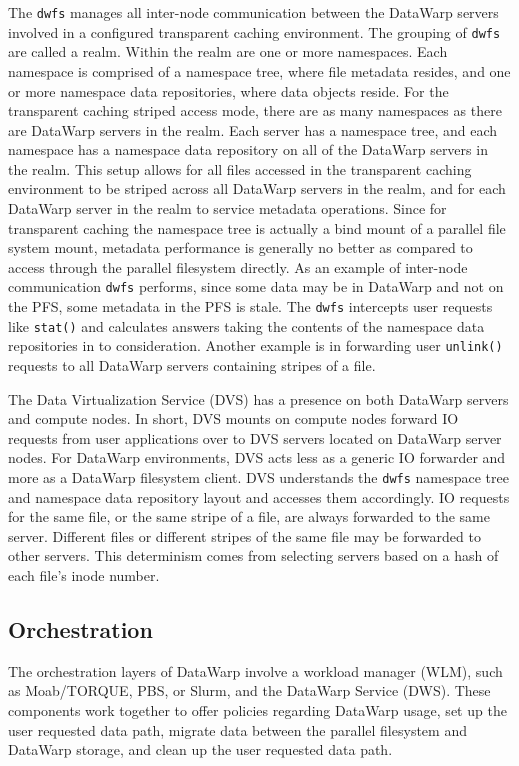 \documentclass[10pt, conference, compsocconf]{IEEEtran}
\begin{document}
The \texttt{dwfs} manages all inter-node communication between the DataWarp servers involved in a configured transparent caching environment.  The grouping of \texttt{dwfs} are called a realm.  Within the realm are one or more namespaces.  Each namespace is comprised of a namespace tree, where file metadata resides, and one or more namespace data repositories, where data objects reside.  For the transparent caching striped access mode, there are as many namespaces as there are DataWarp servers in the realm.  Each server has a namespace tree, and each namespace has a namespace data repository on all of the DataWarp servers in the realm.  This setup allows for all files accessed in the transparent caching environment to be striped across all DataWarp servers in the realm, and for each DataWarp server in the realm to service metadata operations.  Since for transparent caching the namespace tree is actually a bind mount of a parallel file system mount, metadata performance is generally no better as compared to access through the parallel filesystem directly.  As an example of inter-node communication \texttt{dwfs} performs, since some data may be in DataWarp and not on the PFS, some metadata in the PFS is stale.  The \texttt{dwfs} intercepts user requests like \texttt{stat()} and calculates answers taking the contents of the namespace data repositories in to consideration.  Another example is in forwarding user \texttt{unlink()} requests to all DataWarp servers containing stripes of a file.

The Data Virtualization Service (DVS) has a presence on both DataWarp servers and compute nodes.  In short, DVS mounts on compute nodes forward IO requests from user applications over to DVS servers located on DataWarp server nodes.  For DataWarp environments, DVS acts less as a generic IO forwarder and more as a DataWarp filesystem client.  DVS understands the \texttt{dwfs} namespace tree and namespace data repository layout and accesses them accordingly.  IO requests for the same file, or the same stripe of a file, are always forwarded to the same server.  Different files or different stripes of the same file may be forwarded to other servers.  This determinism comes from selecting servers based on a hash of each file's inode number.

\subsection{Orchestration}

The orchestration layers of DataWarp involve a workload manager (WLM), such as Moab/TORQUE, PBS, or Slurm, and the DataWarp Service (DWS).  These components work together to offer policies regarding DataWarp usage, set up the user requested data path, migrate data between the parallel filesystem and DataWarp storage, and clean up the user requested data path.
\end{document}

